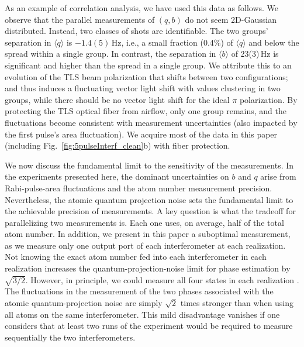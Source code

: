 As an example of correlation analysis, we have used this data as follows. We observe that the parallel measurements of $(q,b)$ do not seem 2D-Gaussian distributed. Instead, two classes of shots are identifiable. The two groups' separation in $\langle q \rangle$ is {$-1.4(5)$\,Hz}, i.e., a small fraction (0.4$\%$) of $\langle q \rangle$ and below the spread within a single group. In contrast, the separation in $\langle b \rangle$ of {23(3)\,Hz} is significant and higher than the spread in a single group. We attribute this to an evolution of the TLS beam polarization that shifts between two configurations; and thus induces a fluctuating vector light shift with values clustering in two groups, while there should be no vector light shift for the ideal $\pi$ polarization. By protecting the TLS optical fiber from airflow, only one group remains, and the fluctuations become consistent with measurement uncertainties (also impacted by the first pulse's area fluctuation). We acquire most of the data in this paper (including Fig.~\ref{fig:5pulseInterf_clean}b) with fiber protection.  


We now discuss the fundamental limit to the sensitivity of the measurements. In the experiments presented here, the dominant uncertainties on $b$ and $q$ arise from Rabi-pulse-area fluctuations and the atom number measurement precision. Nevertheless, the atomic quantum projection noise sets the fundamental limit to the achievable precision of measurements. A key question is what the tradeoff for parallelizing two measurements is. Each one uses, on average, half of the total atom number. In addition, we present in this paper a suboptimal measurement, as we measure only one output port of each interferometer at each realization. Not knowing the exact atom number fed into each interferometer in each realization increases the quantum-projection-noise limit for phase estimation by $\sqrt{3/2}$. However, in principle, we could measure all four states in each realization \cite{Taie2010roa, Stellmer2011dam,Bataille2020}. The fluctuations in the measurement of the two phases associated with the atomic quantum-projection noise are simply $\sqrt{2}$ times stronger than when using all atoms on the same interferometer. This mild disadvantage vanishes if one considers that at least two runs of the experiment would be required to measure sequentially the two interferometers. 


